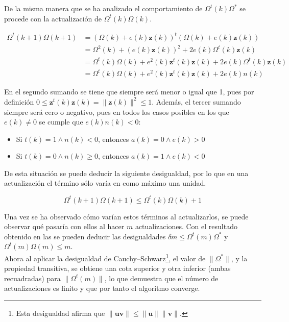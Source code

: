 		De la misma manera que se ha analizado el comportamiento de $\Omega^t(k) \Omega^*$ se procede con la actualización de $\Omega^t(k)\Omega(k)$. 
		
		\begin{align*}
			\Omega^t(k+1)\Omega(k+1) &= (\Omega(k) + e(k)\textbf{z}(k))^t(\Omega(k) + e(k)\textbf{z}(k))\\
			&= \Omega^2(k) + (e(k)\textbf{z}(k))^2 + 2e(k)\Omega^t(k)\textbf{z}(k)\\
			&= \Omega^t(k)\Omega(k) + e^2(k)\textbf{z}^t(k)\textbf{z}(k) + 2e(k)\Omega^t(k)\textbf{z}(k)\\
			&= \Omega^t(k)\Omega(k) + e^2(k)\textbf{z}^t(k)\textbf{z}(k) + 2e(k)n(k)
		\end{align*}
		
		En el segundo sumando se tiene que siempre será menor o igual que 1, pues por definición $0 \leq \textbf{z}^t(k)\textbf{z}(k) = \|\textbf{z}(k)\|^2 \leq 1$. Además, el tercer sumando siempre será cero o negativo, pues en todos los casos posibles en los que $e(k) \neq 0$ se cumple que $e(k)n(k) < 0$: 
		
		\begin{itemize}
			\item Si $t(k) = 1 \land n(k) < 0$, entonces $a(k) = 0 \land e(k) > 0$
			\item Si $t(k) = 0 \land n(k) \geq 0$, entonces $a(k) = 1 \land e(k) < 0$
		\end{itemize}
		
		De esta situación se puede deducir la siguiente desigualdad, por lo que en una actualización el término sólo varía en como máximo una unidad.   
		
		\begin{equation}
			\label{eq:sup_delta}
			\Omega^t(k+1)\Omega(k+1) \leq \Omega^t(k)\Omega(k) + 1
		\end{equation}
		
		Una vez se ha observado cómo varían estos términos al actualizarlos, se puede observar qué pasaría con ellos al hacer $m$ actualizaciones. Con el resultado obtenido en las  se pueden deducir las desigualdades $\delta m \leq \Omega^t(m)\Omega^*$ y $\Omega^t(m)\Omega(m) \leq m$. \\
		
		Ahora al aplicar la desigualdad de Cauchy--Schwarz\footnote{Esta desigualdad afirma que $\|\textbf{u}\textbf{v}\| \leq \|\textbf{u}\|\|\textbf{v}\|$. }, el valor de $\|\Omega^*\|$, y la propiedad transitiva, se obtiene una cota superior y otra inferior (ambas recuadradas) para $\|\Omega^t(m)\|$, lo que demuestra que el número de actualizaciones es finito y que por tanto el algoritmo converge. 
		
